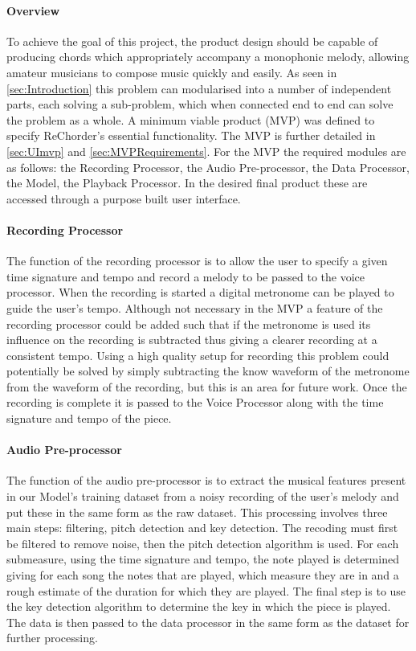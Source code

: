 \paragraph{Overview}
To achieve the goal of this project, the product design should be capable of producing chords which appropriately accompany a monophonic melody, allowing amateur musicians to compose music quickly and easily.
As seen in \cref{sec:Introduction} this problem can modularised into a number of independent parts, each solving a sub-problem, which when connected end to end can solve the problem as a whole.
A minimum viable product (MVP) was defined to specify ReChorder's essential functionality.
The MVP is further detailed in \cref{sec:UImvp} and \cref{sec:MVPRequirements}.
For the MVP the required modules are as follows: the Recording Processor, the Audio Pre-processor, the Data Processor, the Model, the Playback Processor.
In the desired final product these are accessed through a purpose built user interface.

\paragraph{Recording Processor}

The function of the recording processor is to allow the user to specify a given time signature and tempo and record a melody to be passed to the voice processor.
When the recording is started a digital metronome can be played to guide the user's tempo. 
Although not necessary in the MVP a feature of the recording processor could be added such that if the metronome is used its influence on the recording is subtracted thus giving a clearer recording at a consistent tempo.
Using a high quality setup for recording this problem could potentially be solved by simply subtracting the know waveform of the metronome from the waveform of the recording, but this is an area for future work.
Once the recording is complete it is passed to the Voice Processor along with the time signature and tempo of the piece.

\paragraph{Audio Pre-processor}

The function of the audio pre-processor is to extract the musical features present in our Model's training dataset from a noisy recording of the user's melody and put these in the same form as the raw dataset.
This processing involves three main steps: filtering, pitch detection and key detection.
The recoding must first be filtered to remove noise, then the pitch detection algorithm is used.
For each submeasure, using the time signature and tempo, the note played is determined giving for each song the notes that are played, which measure they are in and a rough estimate of the duration for which they are played.
The final step is to use the key detection algorithm to determine the key in which the piece is played.
The data is then passed to the data processor in the same form as the dataset for further processing.

